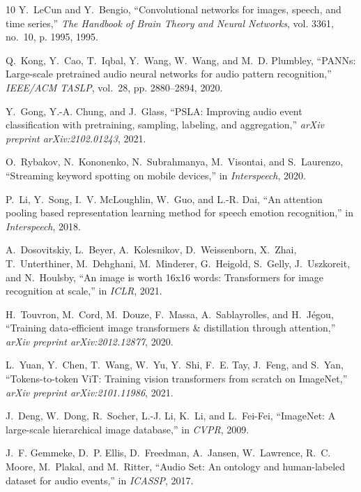 \documentclass[a4paper]{article}
\begin{document}
\begin{thebibliography}{10}
Y.~LeCun and Y.~Bengio, ``Convolutional networks for images, speech, and time
  series,'' \emph{The Handbook of Brain Theory and Neural Networks}, vol. 3361,
  no.~10, p. 1995, 1995.

Q.~Kong, Y.~Cao, T.~Iqbal, Y.~Wang, W.~Wang, and M.~D. Plumbley, ``{PANNs}:
  Large-scale pretrained audio neural networks for audio pattern recognition,''
  \emph{IEEE/ACM TASLP}, vol.~28, pp. 2880--2894, 2020.

Y.~Gong, Y.-A. Chung, and J.~Glass, ``{PSLA}: Improving audio event
  classification with pretraining, sampling, labeling, and aggregation,''
  \emph{arXiv preprint arXiv:2102.01243}, 2021.

O.~Rybakov, N.~Kononenko, N.~Subrahmanya, M.~Visontai, and S.~Laurenzo,
  ``Streaming keyword spotting on mobile devices,'' in \emph{Interspeech},
  2020.

P.~Li, Y.~Song, I.~V. McLoughlin, W.~Guo, and L.-R. Dai, ``An attention pooling
  based representation learning method for speech emotion recognition,'' in
  \emph{Interspeech}, 2018.

A.~Dosovitskiy, L.~Beyer, A.~Kolesnikov, D.~Weissenborn, X.~Zhai,
  T.~Unterthiner, M.~Dehghani, M.~Minderer, G.~Heigold, S.~Gelly, J.~Uszkoreit,
  and N.~Houlsby, ``An image is worth 16x16 words: Transformers for image
  recognition at scale,'' in \emph{ICLR}, 2021.

H.~Touvron, M.~Cord, M.~Douze, F.~Massa, A.~Sablayrolles, and H.~J{\'e}gou,
  ``Training data-efficient image transformers \& distillation through
  attention,'' \emph{arXiv preprint arXiv:2012.12877}, 2020.

L.~Yuan, Y.~Chen, T.~Wang, W.~Yu, Y.~Shi, F.~E. Tay, J.~Feng, and S.~Yan,
  ``Tokens-to-token {ViT}: Training vision transformers from scratch on
  {ImageNet},'' \emph{arXiv preprint arXiv:2101.11986}, 2021.

J.~Deng, W.~Dong, R.~Socher, L.-J. Li, K.~Li, and L.~Fei-Fei, ``{ImageNet}: A
  large-scale hierarchical image database,'' in \emph{CVPR}, 2009.

J.~F. Gemmeke, D.~P. Ellis, D.~Freedman, A.~Jansen, W.~Lawrence, R.~C. Moore,
  M.~Plakal, and M.~Ritter, ``{Audio Set}: An ontology and human-labeled
  dataset for audio events,'' in \emph{ICASSP}, 2017.


\end{thebibliography}
\end{document}
